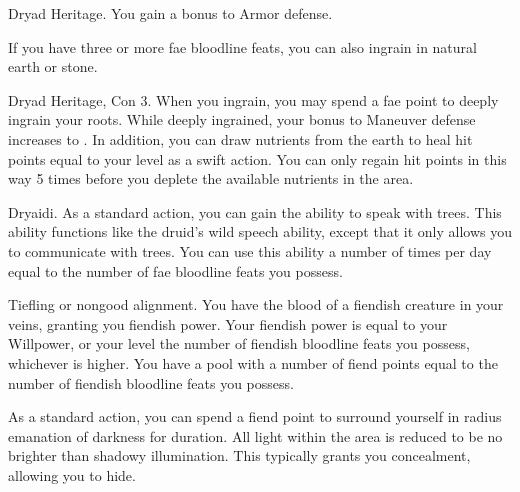\featpre Dryad Heritage.
\featben You gain a  bonus to Armor defense.

If you have three or more fae bloodline feats, you can also ingrain in natural earth or stone.

\featpres Dryad Heritage, Con 3.
\featben When you ingrain, you may spend a fae point to deeply ingrain your roots. While deeply ingrained, your bonus to Maneuver defense increases to . In addition, you can draw nutrients from the earth to heal hit points equal to your level as a swift action. You can only regain hit points in this way 5 times before you deplete the available nutrients in the area. 

\featpre Dryaidi.
\featben As a standard action, you can gain the ability to speak with trees. This ability functions like the druid's wild speech ability, except that it only allows you to communicate with trees. You can use this ability a number of times per day equal to the number of fae bloodline feats you possess.

\featpre Tiefling or nongood alignment.
\featben You have the blood of a fiendish creature in your veins, granting you fiendish power.
Your fiendish power is equal to your Willpower, or your level \add the number of fiendish bloodline feats you possess, whichever is higher.
You have a pool with a number of fiend points equal to the number of fiendish bloodline feats you possess.

As a standard action, you can spend a fiend point to surround yourself in \areamed radius emanation of darkness for \durshort duration.
All light within the area is reduced to be no brighter than shadowy illumination.
This typically grants you concealment, allowing you to hide.
